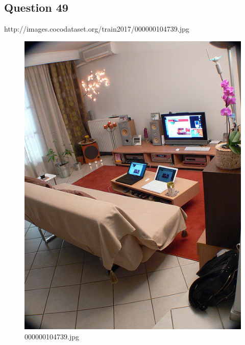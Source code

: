 \subsection*{Question 49}
http://images.cocodataset.org/train2017/000000104739.jpg
\begin{figure}[h]
    \centering
    \includegraphics[width=0.8\linewidth]{../image set/hard/000000104739.jpg}
    \caption{000000104739.jpg}
\end{figure}
